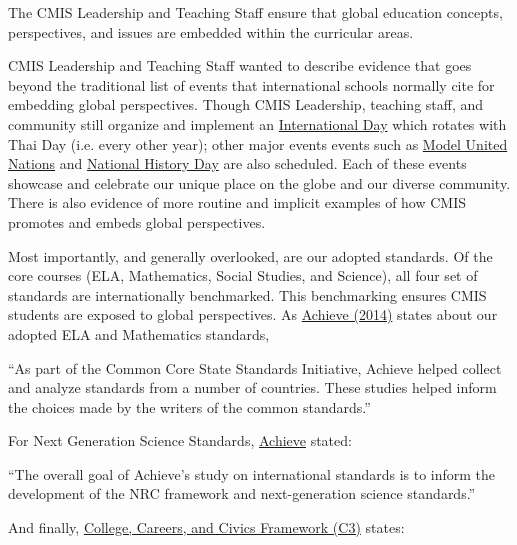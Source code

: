 \begin{findings}
The CMIS Leadership and Teaching Staff ensure that global education concepts, perspectives, and issues are embedded within the curricular areas.

CMIS Leadership and Teaching Staff wanted to describe evidence that goes beyond the traditional list of events that international schools normally cite for embedding global perspectives. Though CMIS Leadership, teaching staff, and community still organize and implement an \href{https://drive.google.com/drive/folders/0B0TYmzaZNi3fbnhzMzNNT3hKNm8?usp=sharing}{International Day} which rotates with Thai Day (i.e. every other year); other major events events such as \href{https://drive.google.com/drive/folders/0B0TYmzaZNi3fdlJuWDFxb0NpemM?usp=sharing}{Model United Nations} and \href{https://drive.google.com/drive/folders/0B0TYmzaZNi3fUkdpR1hLaDVaekk?usp=sharing}{National History Day} are also scheduled. Each of these events showcase and celebrate our unique place on the globe and our diverse community. There is also evidence of more routine and implicit examples of how CMIS promotes and embeds global perspectives. 


Most importantly, and generally overlooked, are our adopted standards. Of the core courses (ELA, Mathematics, Social Studies, and Science), all four set of standards are internationally benchmarked. This benchmarking  ensures CMIS students are exposed to global perspectives. As \href{https://docs.google.com/a/cmis.ac.th/document/d/1ApZ_fARdmcK_9fEeb8uoWyGa50572P8z-sM9JeTQygQ/edit?usp=sharing}{Achieve (2014)} states about our adopted ELA and Mathematics standards, 

“As part of the Common Core State Standards Initiative, Achieve helped collect and analyze standards from a number of countries. These studies helped inform the choices made by the writers of the common standards.”

For Next Generation Science Standards, \href{https://docs.google.com/a/cmis.ac.th/document/d/1ApZ_fARdmcK_9fEeb8uoWyGa50572P8z-sM9JeTQygQ/edit?usp=sharing}{Achieve} stated: 

“The overall goal of Achieve’s study on international standards is to inform the development of the NRC framework and next-generation science standards.”

And finally, \href{https://docs.google.com/a/cmis.ac.th/document/d/1ApZ_fARdmcK_9fEeb8uoWyGa50572P8z-sM9JeTQygQ/edit?usp=sharing}{College, Careers, and Civics Framework (C3)} states: 


\end{findings}
